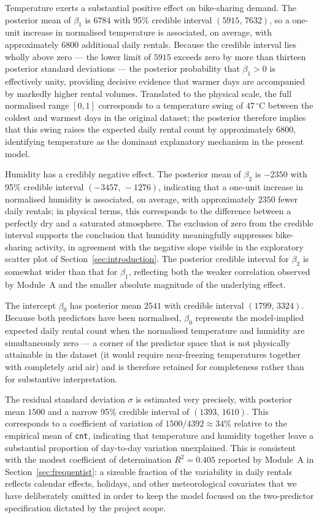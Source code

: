 Temperature exerts a substantial positive effect on bike-sharing demand. The posterior mean of $\beta_1$ is $6784$ with 95\% credible interval $(5915,\, 7632)$, so a one-unit increase in normalised temperature is associated, on average, with approximately $6800$ additional daily rentals. Because the credible interval lies wholly above zero --- the lower limit of $5915$ exceeds zero by more than thirteen posterior standard deviations --- the posterior probability that $\beta_1 > 0$ is effectively unity, providing decisive evidence that warmer days are accompanied by markedly higher rental volumes. Translated to the physical scale, the full normalised range $[0, 1]$ corresponds to a temperature swing of $47\,^{\circ}\text{C}$ between the coldest and warmest days in the original dataset; the posterior therefore implies that this swing raises the expected daily rental count by approximately $6800$, identifying temperature as the dominant explanatory mechanism in the present model.

Humidity has a credibly negative effect. The posterior mean of $\beta_2$ is $-2350$ with 95\% credible interval $(-3457,\, -1276)$, indicating that a one-unit increase in normalised humidity is associated, on average, with approximately $2350$ fewer daily rentals; in physical terms, this corresponds to the difference between a perfectly dry and a saturated atmosphere. The exclusion of zero from the credible interval supports the conclusion that humidity meaningfully suppresses bike-sharing activity, in agreement with the negative slope visible in the exploratory scatter plot of Section~\ref{sec:introduction}. The posterior credible interval for $\beta_2$ is somewhat wider than that for $\beta_1$, reflecting both the weaker correlation observed by Module~A and the smaller absolute magnitude of the underlying effect.

The intercept $\beta_0$ has posterior mean $2541$ with credible interval $(1799,\, 3324)$. Because both predictors have been normalised, $\beta_0$ represents the model-implied expected daily rental count when the normalised temperature and humidity are simultaneously zero --- a corner of the predictor space that is not physically attainable in the dataset (it would require near-freezing temperatures together with completely arid air) and is therefore retained for completeness rather than for substantive interpretation.

The residual standard deviation $\sigma$ is estimated very precisely, with posterior mean $1500$ and a narrow 95\% credible interval of $(1393,\, 1610)$. This corresponds to a coefficient of variation of $1500 / 4392 \approx 34\%$ relative to the empirical mean of \texttt{cnt}, indicating that temperature and humidity together leave a substantial proportion of day-to-day variation unexplained. This is consistent with the modest coefficient of determination $R^{2} = 0.405$ reported by Module~A in Section~\ref{sec:frequentist}: a sizeable fraction of the variability in daily rentals reflects calendar effects, holidays, and other meteorological covariates that we have deliberately omitted in order to keep the model focused on the two-predictor specification dictated by the project scope.

